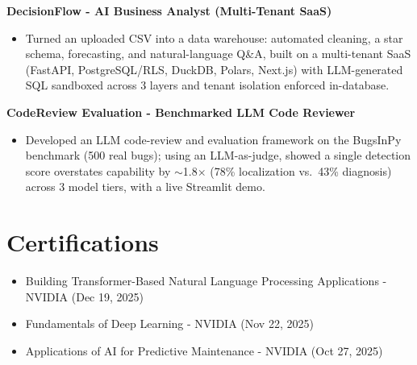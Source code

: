 \documentclass[11pt,a4paper]{article}
\newcommand{\proj}[1]{\textbf{#1}\par}
\begin{document}
\proj{DecisionFlow - AI Business Analyst (Multi-Tenant SaaS)}
\begin{itemize}
  \item Turned an uploaded CSV into a data warehouse: automated cleaning, a star schema, forecasting, and
        natural-language Q\&A, built on a multi-tenant SaaS (FastAPI, PostgreSQL/RLS, DuckDB, Polars,
        Next.js) with LLM-generated SQL sandboxed across 3 layers and tenant isolation enforced in-database.
\end{itemize}

\proj{CodeReview Evaluation - Benchmarked LLM Code Reviewer}
\begin{itemize}
  \item Developed an LLM code-review and evaluation framework on the BugsInPy benchmark (500 real bugs); using
        an LLM-as-judge, showed a single detection score overstates capability by $\sim$1.8$\times$
        (78\% localization vs.\ 43\% diagnosis) across 3 model tiers, with a live Streamlit demo.
\end{itemize}

\section{Certifications}
\begin{itemize}
  \item Building Transformer-Based Natural Language Processing Applications - NVIDIA {\color{muted}(Dec 19, 2025)}
  \item Fundamentals of Deep Learning - NVIDIA {\color{muted}(Nov 22, 2025)}
  \item Applications of AI for Predictive Maintenance - NVIDIA {\color{muted}(Oct 27, 2025)}
\end{itemize}

\end{document}
